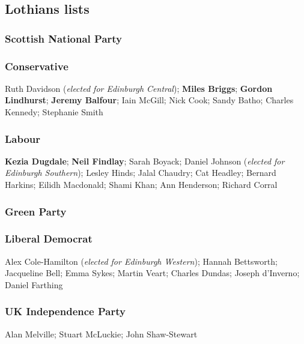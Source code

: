 \subsection*{Lothians lists}

\begin{resultsiii}
\subsubsection*{Scottish National Party}
\subsubsection*{Conservative}
Ruth Davidson (\emph{elected for Edinburgh Central}); \textbf{Miles Briggs}; \textbf{Gordon Lindhurst}; \textbf{Jeremy Balfour}; Iain McGill; Nick Cook; Sandy Batho; Charles Kennedy; Stephanie Smith
\subsubsection*{Labour}
\textbf{Kezia Dugdale}; \textbf{Neil Findlay}; Sarah Boyack; Daniel Johnson (\emph{elected for Edinburgh Southern}); Lesley Hinds; Jalal Chaudry; Cat Headley; Bernard Harkins; Eilidh Macdonald; Shami Khan; Ann Henderson; Richard Corral
\subsubsection*{Green Party}
\subsubsection*{Liberal Democrat}
Alex Cole-Hamilton (\emph{elected for Edinburgh Western}); Hannah Bettsworth; Jacqueline Bell; Emma Sykes; Martin Veart; Charles Dundas; Joseph d'Inverno; Daniel Farthing
\subsubsection*{UK Independence Party}
Alan Melville; Stuart McLuckie; John Shaw-Stewart

\end{resultsiii}
